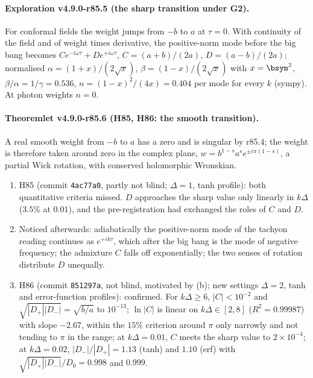 \paragraph{Exploration v4.9.0-r85.5 (the sharp transition under G2).}
For conformal fields the weight jumps from \(-b\) to \(a\) at \(\tau=0\).  With continuity of the field and of weight times derivative, the
positive-norm mode before the big bang becomes \(C e^{-i\omega\tau}+De^{+i\omega\tau}\), \(C=(a+b)/(2a)\), \(D=(a-b)/(2a)\); normalised
\(\alpha=(1+x)/(2\sqrt x)\), \(\beta=(1-x)/(2\sqrt x)\) with \(x=\bsym^2\), \(\beta/\alpha=1/\gamma=0.536\), \(n=(1-x)^2/(4x)=0.404\) per mode for every \(k\)
(sympy).  At photon weights \(n=0\).

\paragraph{Theoremlet v4.9.0-r85.6 (H85, H86: the smooth transition).}
A real smooth weight from \(-b\) to \(a\) has a zero and is singular by r85.4; the weight is therefore taken around zero in the complex
plane, \(w=b^{1-s}a^se^{\pm i\pi(1-s)}\), a partial Wick rotation, with conserved holomorphic Wronskian.
\begin{enumerate}[leftmargin=2em]
\item[(a)] H85 (commit \texttt{4ac77a0}, partly not blind; \(\Delta=1\), tanh profile): both quantitative criteria missed.  \(D\) approaches the
sharp value only linearly in \(k\Delta\) (\(3.5\%\) at \(0.01\)), and the pre-registration had exchanged the roles of \(C\) and \(D\).
\item[(b)] Noticed afterwards: adiabatically the positive-norm mode of the tachyon reading continues as \(e^{+ik\tau}\), which after the big bang
is the mode of negative frequency; the admixture \(C\) falls off exponentially; the two senses of rotation distribute \(D\) unequally.
\item[(c)] H86 (commit \texttt{851297a}, not blind, motivated by (b); new settings \(\Delta=2\), tanh and error-function profiles): confirmed.
For \(k\Delta\ge6\), \(|C|<10^{-2}\) and \(\sqrt{|D_+||D_-|}=\sqrt{b/a}\) to \(10^{-13}\); \(\ln|C|\) is linear on \(k\Delta\in[2,8]\) (\(R^2=0.99987\)) with slope
\(-2.67\), within the \(15\%\) criterion around \(\pi\) only narrowly and not tending to \(\pi\) in the range; at \(k\Delta=0.01\), \(C\) meets the sharp
value to \(2\times10^{-4}\); at \(k\Delta=0.02\), \(|D_-|/|D_+|=1.13\) (tanh) and \(1.10\) (erf) with \(\sqrt{|D_+||D_-|}/D_0=0.998\) and \(0.999\).
\end{enumerate}

